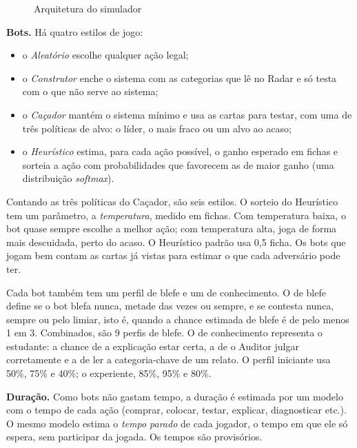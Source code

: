 \begin{figure}[ht]
  \centering
  \resizebox{\linewidth}{!}{}
  \caption{Arquitetura do simulador}
  \label{fig:arquitetura}
\end{figure}

\textbf{Bots.} Há quatro estilos de jogo:
\begin{itemize}
  \item o \emph{Aleatório} escolhe qualquer ação legal;
  \item o \emph{Construtor} enche o sistema com as categorias que lê no Radar e só testa com o que não serve ao
    sistema;
  \item o \emph{Caçador} mantém o sistema mínimo e usa as cartas para testar, com uma de três políticas de alvo:
    o líder, o mais fraco ou um alvo ao acaso;
  \item o \emph{Heurístico} estima, para cada ação possível, o ganho esperado em fichas e sorteia a ação com
    probabilidades que favorecem as de maior ganho (uma distribuição \emph{softmax}).
\end{itemize}
Contando as três políticas do Caçador, são seis estilos. O sorteio do Heurístico tem um parâmetro, a
\emph{temperatura}, medido em fichas. Com temperatura baixa, o bot quase sempre escolhe a melhor ação; com
temperatura alta, joga de forma mais descuidada, perto do acaso. O Heurístico padrão usa 0,5 ficha. Os bots que
jogam bem contam as cartas já vistas para estimar o que cada adversário pode ter.

Cada bot também tem um perfil de blefe e um de conhecimento. O de blefe define se o bot blefa nunca, metade
das vezes ou sempre, e se contesta nunca, sempre ou pelo limiar, isto é, quando a chance estimada de blefe é de
pelo menos 1 em 3. Combinados, são 9 perfis de blefe. O de conhecimento representa o estudante: a chance de a
explicação estar certa, a de o Auditor julgar corretamente e a de ler a categoria-chave de um relato. O perfil
iniciante usa 50\%, 75\% e 40\%; o experiente, 85\%, 95\% e 80\%. 

\textbf{Duração.} Como bots não gastam tempo, a duração é estimada por um modelo com o tempo de cada ação
(comprar, colocar, testar, explicar, diagnosticar etc.). O mesmo modelo estima o \emph{tempo parado} de cada
jogador, o tempo em que ele só espera, sem participar da jogada. Os tempos são provisórios.

